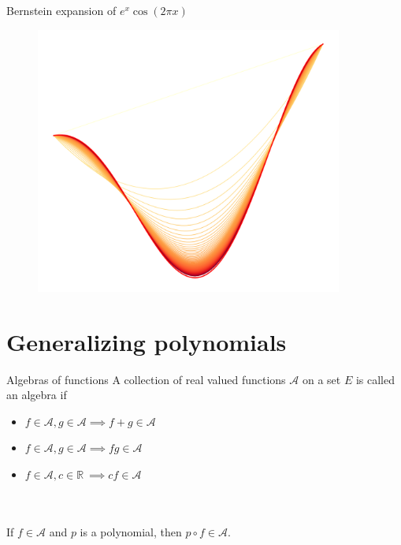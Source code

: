 \documentclass{beamer}
\def\R{\mathbb{R}}
\begin{document}
    \begin{frame}{Bernstein expansion of $e^x\cos(2\pi x)$}
        \begin{figure}
            \centering
            \includegraphics[width=0.9\textwidth]{./img/expansions.png}
            \label{fig:bernstein_expansion}
        \end{figure}
    \end{frame}

    \section{Generalizing polynomials}

    \begin{frame}{Algebras of functions}
        A collection of real valued functions $\mathscr{A}$ on a set $E$ is called an
        algebra if
        \begin{itemize}
            \item $f \in \mathscr{A}, g \in \mathscr{A} \implies f + g \in \mathscr{A}$
            \item $f \in \mathscr{A}, g \in \mathscr{A} \implies fg \in \mathscr{A}$
            \item $f \in \mathscr{A}, c \in \R \:\implies cf \in \mathscr{A}$
        \end{itemize}

        \\~\\

        If $f \in \mathscr{A}$ and $p$ is a polynomial, then $p\circ f \in
        \mathscr{A}$.
    \end{frame}
\end{document}
